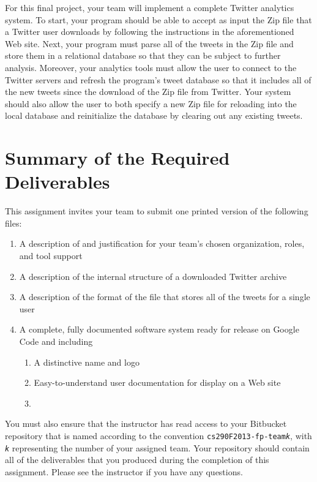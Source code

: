 For this final project, your team will implement a complete Twitter analytics system.  To start, your program should be
able to accept as input the Zip file that a Twitter user downloads by following the instructions in the aforementioned
Web site. Next, your program must parse all of the tweets in the Zip file and store them in a relational database so
that they can be subject to further analysis. Moreover, your analytics tools must allow the user to connect to the
Twitter servers and refresh the program's tweet database so that it includes all of the new tweets since the download of
the Zip file from Twitter. Your system should also allow the user to both specify a new Zip file for reloading into the
local database and reinitialize the database by clearing out any existing tweets.

\section*{Summary of the Required Deliverables}

This assignment invites your team to submit one printed version of the following files:
\vspace*{-.1in}
\begin{enumerate}
	\itemsep0em 
	\item A description of and justification for your team's chosen organization, roles, and tool support
	\item A description of the internal structure of a downloaded Twitter archive
	\item A description of the format of the file that stores all of the tweets for a single user
	\item A complete, fully documented software system ready for release on Google Code and including
	\begin{enumerate}
		\item A distinctive name and logo
		\item Easy-to-understand user documentation for display on a Web site
		\item 
	\end{enumerate}

\end{enumerate}
\vspace*{-.1in}

You must also ensure that the instructor has read access to your Bitbucket repository that is named according to the
convention {\tt cs290F2013-fp-team{\em k}}, with {\tt {\em k}} representing the number of your assigned team.  Your
repository should contain all of the deliverables that you produced during the completion of this assignment.  Please
see the instructor if you have any questions. 
 


